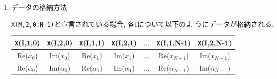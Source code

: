 \documentclass[a4j]{jsarticle}
\begin{document}
\begin{enumerate}
  \item データの格納方法

  \texttt{X(M,2,0:N-1)}と宣言されている場合, 各Iについて以下のよ
   うにデータが格納される.

    \begin{tabular}{|c|c|c|c|c|c|c|}\hline
     \texttt X(I,1,0) & \texttt X(I,2,0) & \texttt X(I,1,1) & \texttt X(I,2,1) & 
     $\ldots$ & \texttt X(I,1,N-1) & \texttt X(I,2,N-1) \\\hline\hline
      \mbox{Re}($x_0$) & \mbox{Im}($x_0$) & \mbox{Re}($x_1$) & \mbox{Im}($x_1$) &
     $\ldots$ & \mbox{Re}($x_{N-1}$) & \mbox{Im}($x_{N-1}$) \\\hline
      \mbox{Re}($\alpha_0$) & \mbox{Im}($\alpha_0$) & \mbox{Re}($\alpha_1$) & \mbox{Im}($\alpha_1$) &
     $\ldots$ & \mbox{Re}($\alpha_{N-1}$) & \mbox{Im}($\alpha_{N-1}$) \\\hline
    \end{tabular}

\end{enumerate}

\newpage
\end{document}
